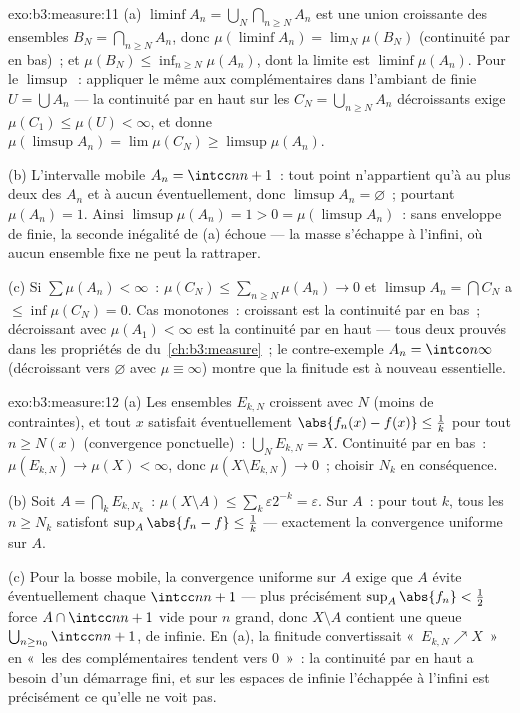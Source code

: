 \begin{solution}{exo:b3:measure:11}
(a) $\liminf A_n = \bigcup_N\bigcap_{n\geq N}A_n$ est une
union croissante des ensembles $B_N = \bigcap_{n\geq
N}A_n$, donc $\mu(\liminf A_n) = \lim_N\mu(B_N)$
(continuité par en bas)~; et $\mu(B_N) \leq \inf_{n \geq
N}\mu(A_n)$, dont la limite est $\liminf\mu(A_n)$. Pour le
$\limsup$~: appliquer le même aux complémentaires dans
l'ambiant de  finie $U = \bigcup A_n$ --- la continuité
par en haut sur les $C_N = \bigcup_{n\geq N}A_n$ décroissants
exige $\mu(C_1) \leq \mu(U) < \infty$, et donne
$\mu(\limsup A_n) = \lim\mu(C_N) \geq \limsup\mu(A_n)$.

(b) L'intervalle mobile $A_n = \intcc n{n+1}$~: tout point
n'appartient qu'à au plus deux des $A_n$ et à aucun
éventuellement, donc $\limsup A_n = \varnothing$~; pourtant
$\mu(A_n) = 1$. Ainsi $\limsup\mu(A_n) = 1 > 0 =
\mu(\limsup A_n)$~: sans enveloppe de  finie, la
seconde inégalité de (a) échoue --- la masse s'échappe à
l'infini, où aucun ensemble fixe ne peut la rattraper.

(c) Si $\sum\mu(A_n) < \infty$~: $\mu(C_N) \leq
\sum_{n\geq N}\mu(A_n) \to 0$ et $\limsup A_n = \bigcap
C_N$ a  $\leq \inf\mu(C_N) = 0$. Cas monotones~:
croissant est la continuité par en bas~; décroissant avec
$\mu(A_1) < \infty$ est la continuité par en haut --- tous
deux prouvés dans les propriétés de 
du~\cref{ch:b3:measure}~; le contre-exemple $A_n = \intco
n\infty$ (décroissant vers $\varnothing$ avec $\mu \equiv
\infty$) montre que la finitude est à nouveau essentielle.
\end{solution}

\begin{solution}{exo:b3:measure:12}
(a) Les ensembles $E_{k,N}$ croissent avec $N$ (moins de
contraintes), et tout $x$ satisfait éventuellement
$\abs{f_n(x) - f(x)} \leq \frac1k$ pour tout $n \geq N(x)$
(convergence ponctuelle)~: $\bigcup_NE_{k,N} = X$. Continuité
par en bas~: $\mu(E_{k,N}) \to \mu(X) < \infty$, donc
$\mu(X\setminus E_{k,N}) \to 0$~; choisir $N_k$ en
conséquence.

(b) Soit $A = \bigcap_kE_{k,N_k}$~: $\mu(X\setminus A) \leq
\sum_k\varepsilon2^{-k} = \varepsilon$. Sur $A$~: pour tout
$k$, tous les $n \geq N_k$ satisfont $\sup_A\abs{f_n - f}
\leq \frac1k$ --- exactement la convergence uniforme sur
$A$.

(c) Pour la bosse mobile, la convergence uniforme sur $A$
exige que $A$ évite éventuellement chaque $\intcc n{n+1}$ ---
plus précisément $\sup_A\abs{f_n} < \frac12$ force $A \cap
\intcc n{n+1}$ vide pour $n$ grand, donc $X \setminus A$
contient une queue $\bigcup_{n\geq n_0}\intcc n{n+1}$, de
 infinie. En (a), la finitude convertissait
«~$E_{k,N}\nearrow X$~» en «~les  des complémentaires
tendent vers $0$~»~: la continuité par en haut a besoin d'un
démarrage fini, et sur les espaces de  infinie
l'échappée à l'infini est précisément ce qu'elle ne voit
pas.
\end{solution}

